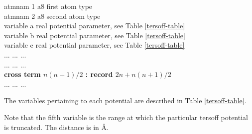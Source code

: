 \begin{enumerate}
\begin{tabbing}
\> atmnam 1     \> a8   \> first atom type \\
\> atmnam 2     \> a8   \> second atom type \\
\> variable a   \> real \> potential parameter, see Table \ref{tersoff-table} \\
\> variable b   \> real \> potential parameter, see Table \ref{tersoff-table} \\
\> variable c   \> real \> potential parameter, see Table \ref{tersoff-table} \\
\> ... \> ... \> ... \\
\> ... \> ... \> ... \\
{\bf cross term $n(n+1)/2$ : record $2n+n(n+1)/2$} \\
\> ... \> ... \> ...
\end{tabbing}
The variables pertaining to each potential are described in Table
\ref{tersoff-table}.

Note that the fifth variable is the range at which the particular
tersoff potential is truncated.  The
distance is in \AA.

\begin{table}[htbp]
\end{table}


\end{enumerate}
